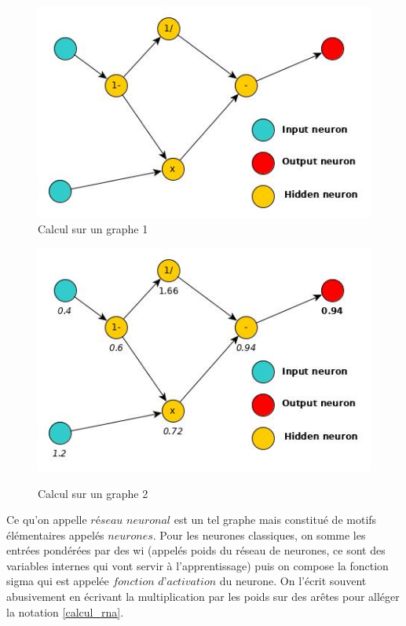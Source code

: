 \documentclass[10pt]{article}
\begin{document}
\begin{figure}[!h]
\centering
\includegraphics[scale=0.45]{ex_neuron.jpg}
\caption{Calcul sur un graphe 1}
\label{calcul_graphe_1}
\end{figure}

\begin{figure}[!t]
\centering
\includegraphics[scale=0.45]{ex_computation_neuron.jpg}\\
\caption{Calcul sur un graphe 2}
\label{calcul_graphe_2}
\end{figure}



Ce qu'on appelle $\textit{réseau neuronal}$ est un tel graphe mais constitué de motifs élémentaires appelés $\textit{neurones}$. Pour les neurones classiques, on somme les entrées pondérées par des wi (appelés poids du réseau de neurones, ce sont des variables internes qui vont servir à l'apprentissage) puis on compose la fonction sigma qui est appelée $\textit{fonction d'activation}$ du neurone. On l'écrit souvent abusivement en écrivant la multiplication par les poids sur des arêtes pour alléger la notation \ref{calcul_rna}.
\end{document}
